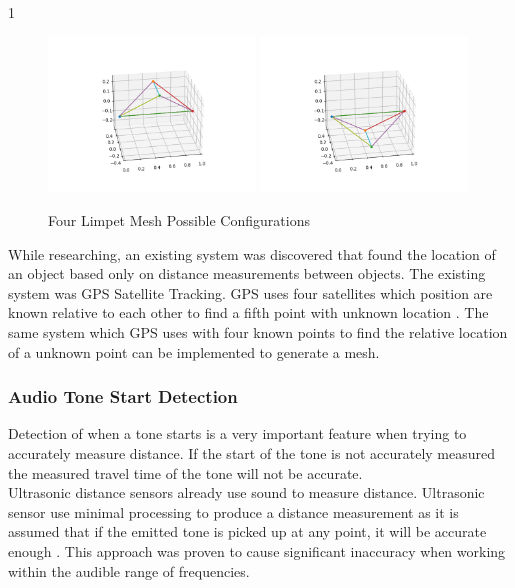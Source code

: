 1\documentclass{article}
\begin{document}
\begin{figure}[H]
	\centering
	\noindent\includegraphics[width=0.49\textwidth]{images/4LimpetNet}
	\noindent\includegraphics[width=0.49\textwidth]{images/4LimpetNetFlip}
	\caption{Four Limpet Mesh Possible Configurations}
	\label{fig:4PMesh}
\end{figure}

While researching, an existing system was discovered that found the location of an object based only on distance measurements between objects. The existing system was GPS Satellite Tracking. GPS uses four satellites which position are known relative to each other to find a fifth point with unknown location \cite{gps}. The same system which GPS uses with four known points to find the relative location of a unknown point can be implemented to generate a mesh.\\


\subsubsection{Audio Tone Start Detection}
Detection of when a tone starts is a very important feature when trying to accurately measure distance. If the start of the tone is not accurately measured the measured travel time of the tone will not be accurate.\\

Ultrasonic distance sensors already use sound to measure distance. Ultrasonic sensor use minimal processing to produce a distance measurement as it is assumed that if the emitted tone is picked up at any point, it will be accurate enough \cite{toa_akeem_2020}. This approach was proven to cause significant inaccuracy when working within the audible range of frequencies.\\
\end{document}
